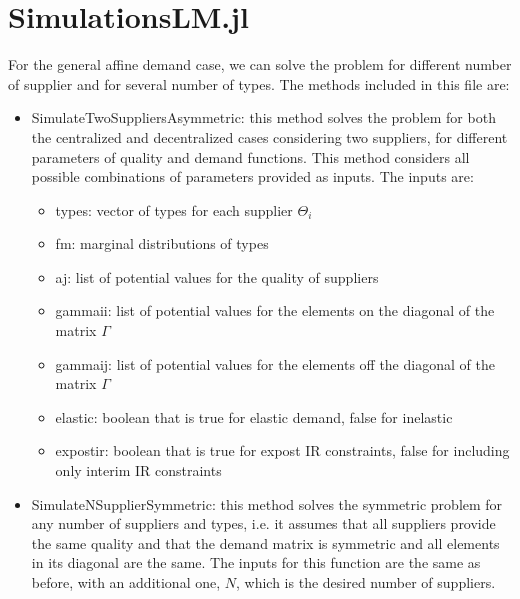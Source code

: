 \documentclass[11pt, oneside]{article}
\begin{document}
\section{SimulationsLM.jl}
For the general affine demand case, we can solve the problem for different number of
supplier and for several number of types. The methods included in this file are:
\begin{itemize}
    \item SimulateTwoSuppliersAsymmetric: this method solves the problem for both
    the centralized and decentralized cases considering two suppliers, for different parameters of quality and
    demand functions. This method considers all possible combinations of parameters provided as inputs. The inputs
    are:
    \begin{itemize}
        \item types: vector of types for each supplier \(\Theta_i\)
        \item fm: marginal distributions of types
        \item aj: list of potential values for the quality of suppliers
        \item gammaii: list of potential values for the elements on the diagonal of the matrix \(\Gamma\)
        \item gammaij: list of potential values for the elements off the diagonal of the matrix \(\Gamma\)
        \item elastic: boolean that is true for elastic demand, false for inelastic
        \item expostir: boolean that is true for expost IR constraints, false for including only interim IR constraints
    \end{itemize}

    \item SimulateNSupplierSymmetric: this method solves the symmetric problem for any number of
    suppliers and types, i.e. it assumes that all suppliers provide the same quality and that the
    demand matrix is symmetric and all elements in its diagonal are the same. The inputs for this
    function are the same as before, with an additional one, \(N\), which is the desired number of
    suppliers.
\end{itemize}
\end{document}
